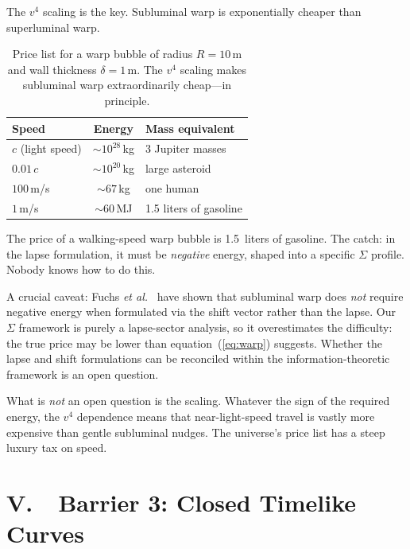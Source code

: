 \documentclass[12pt]{article}
\renewcommand{\baselinestretch}{2.0}
\begin{document}
The $v^4$ scaling is the key. Subluminal warp is exponentially cheaper
than superluminal warp.

\begin{table}[h]
\renewcommand{\baselinestretch}{1.2}\selectfont
\centering
\begin{tabular}{@{}l c l@{}}
\toprule
Speed & Energy & Mass equivalent \\
\midrule
$c$ (light speed)  & $\sim 10^{28}$\,kg  & 3 Jupiter masses \\
$0.01\,c$          & $\sim 10^{20}$\,kg  & large asteroid \\
$100$\,m/s         & $\sim 67$\,kg        & one human \\
$1$\,m/s           & $\sim 60$\,MJ        & 1.5 liters of gasoline \\
\bottomrule
\end{tabular}
\caption{Price list for a warp bubble of radius $R = 10$\,m and wall
thickness $\delta = 1$\,m. The $v^4$ scaling makes subluminal warp
extraordinarily cheap---in principle.}
\label{tab:warp}
\end{table}

The price of a walking-speed warp bubble is 1.5~liters of gasoline.
The catch: in the lapse formulation, it must be \emph{negative}
energy, shaped into a specific $\Sigma$ profile. Nobody knows how
to do this.

A crucial caveat: Fuchs \emph{et al.}\ \cite{Fuchs2024} have shown
that subluminal warp does \emph{not} require negative energy when
formulated via the shift vector rather than the lapse. Our $\Sigma$
framework is purely a lapse-sector analysis, so it overestimates the
difficulty: the true price may be lower than
equation~(\ref{eq:warp}) suggests. Whether the lapse and shift
formulations can be reconciled within the information-theoretic
framework is an open question.

What is \emph{not} an open question is the scaling. Whatever the sign
of the required energy, the $v^4$ dependence means that near-light-speed
travel is vastly more expensive than gentle subluminal nudges. The
universe's price list has a steep luxury tax on speed.


\section*{V.\ \ Barrier 3: Closed Timelike Curves}
\end{document}
